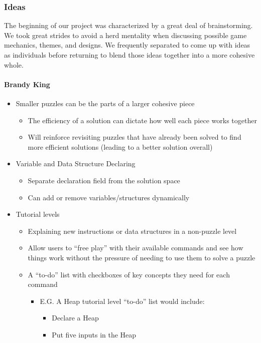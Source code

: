 \subsubsection{Ideas}
The beginning of our project was characterized by a great deal of brainstorming. We took great strides
to avoid a herd mentality when discussing possible game mechanics, themes, and designs. We frequently
separated to come up with ideas as individuals before returning to blend those ideas together into a more
cohesive whole.

\paragraph{Brandy King}
\begin{itemize}
  \item Smaller puzzles can be the parts of a larger cohesive piece
  \begin{itemize}
    \item The efficiency of a solution can dictate how well each piece works
    together
    \item Will reinforce revisiting puzzles that have already been solved to
    find more efficient solutions (leading to a better solution overall)
  \end{itemize}
  \item Variable and Data Structure Declaring
  \begin{itemize}
    \item Separate declaration field from the solution space
    \item Can add or remove variables/structures dynamically
  \end{itemize}
  \item Tutorial levels
  \begin{itemize}
    \item Explaining new instructions or data structures in a non-puzzle level
    \item Allow users to “free play” with their available commands and see how
    things work without the pressure of needing to use them to solve a puzzle
    \item A “to-do” list with checkboxes of key concepts they need for each
    command
    \begin{itemize}
      \item E.G. A Heap tutorial level “to-do” list would include:
      \begin{itemize}
        \item Declare a Heap
        \item Put five inputs in the Heap

\end{itemize}
\end{itemize}
\end{itemize}
\end{itemize}
